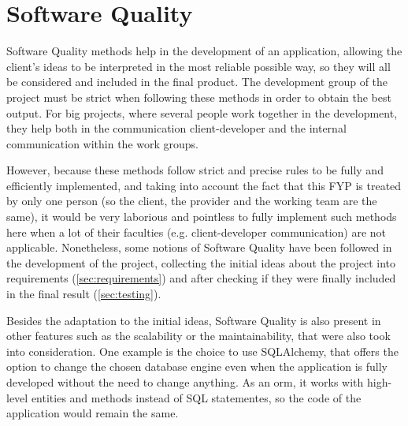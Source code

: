                                                                                              
\section{Software Quality}
Software Quality methods help in the development of an application, allowing the client's ideas to be interpreted in the most reliable possible way, so they will all be considered and included in the final product. The development group of the project must be strict when following these methods in order to obtain the best output. For big projects, where several people work together in the development, they help both in the communication client-developer and the internal communication within the work groups.

However, because these methods follow strict and precise rules to be fully and efficiently implemented, and taking into account the fact that this FYP is treated by only one person (so the client, the provider and the working team are the same), it would be very laborious and pointless to fully implement such methods here when a lot of their faculties (e.g. client-developer communication) are not applicable. Nonetheless, some notions of Software Quality have been followed in the development of the project, collecting the initial ideas about the project into requirements (\ref{sec:requirements}) and after checking if they were finally included in the final result (\ref{sec:testing}).

Besides the adaptation to the initial ideas, Software Quality is also present in other features such as the scalability or the maintainability, that were also took into consideration. One example is the choice to use SQLAlchemy, that offers the option to change the chosen database engine even when the application is fully developed without the need to change anything. As an \gls{orm}, it works with high-level entities and methods instead of SQL statementes, so the code of the application would remain the same. 

